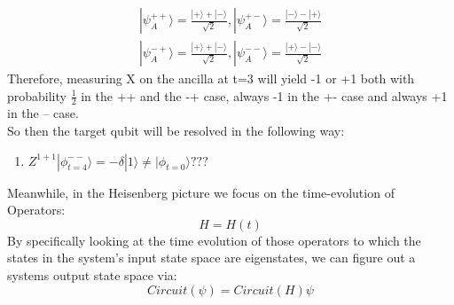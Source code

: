 \begin{align}
	|\psi_A^{++}\rangle = \frac{|+\rangle+|-\rangle}{\sqrt{2}},
	|\psi_A^{+-}\rangle = \frac{|-\rangle-|+\rangle}{\sqrt{2}}\\
	|\psi_A^{-+}\rangle = \frac{|+\rangle+|-\rangle}{\sqrt{2}},
	|\psi_A^{--}\rangle = \frac{|+\rangle-|-\rangle}{\sqrt{2}}
\end{align}
Therefore, measuring X on the ancilla at t=3 will yield -1 or +1 both with probability
$\frac{1}{2}$ in the ++ and the -+ case, always -1 in the +- case and always +1 in the -- case.
\\
So then the target qubit will be resolved in the following way:
\begin{enumerate}
	\item $Z^{1+1} |\phi^{--}_{t=4}\rangle = -\delta|1\rangle \neq |\phi_{t=0}\rangle ???$
\end{enumerate}


\newpage
Meanwhile, in the Heisenberg picture we focus on the time-evolution of Operators:
\begin{equation}
	H = H(t)
\end{equation}
By specifically looking at the time evolution of those operators
to which the states in the system's input state space are 
eigenstates, we can figure out a systems output state space via:
\begin{equation}
	Circuit(\psi)=Circuit(H)\psi
\end{equation}
